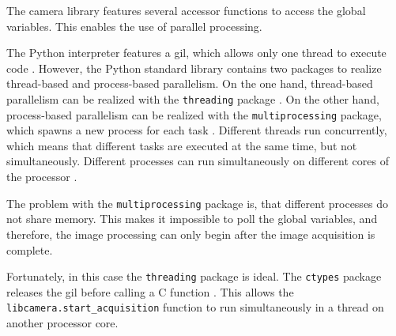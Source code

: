 The camera library features several accessor functions to access the global variables.
This enables the use of parallel processing.

The Python interpreter features a \acrfull{gil}, which allows only one thread to execute code \cite{}. %
However, the Python standard library contains two packages to realize thread-based and process-based parallelism.
On the one hand, thread-based parallelism can be realized with the \texttt{threading} package \cite{}. %
On the other hand, process-based parallelism can be realized with the \texttt{multiprocessing} package, which spawns a new process for each task \cite{}. %
Different threads run concurrently, which means that different tasks are executed at the same time, but not simultaneously.
Different processes can run simultaneously on different cores of the processor \cite{}. %

The problem with the \texttt{multiprocessing} package is, that different processes do not share memory.
This makes it impossible to poll the global variables, and therefore, the image processing can only begin after the image acquisition is complete.

Fortunately, in this case the \texttt{threading} package is ideal.
The \texttt{ctypes} package releases the \acrshort{gil} before calling a C function \cite{}. %
This allows the \texttt{libcamera.start\_acquisition} function to run simultaneously in a thread on another processor core.

